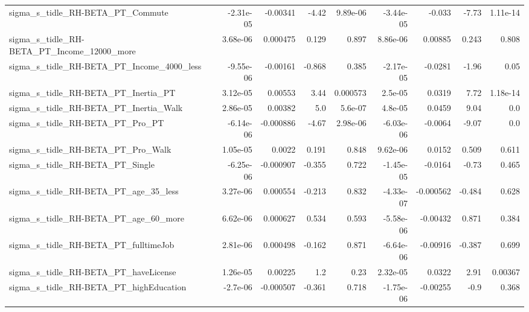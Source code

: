 \begin{tabular}{lrrrrrrrr}
sigma\_s\_tidle\_RH-BETA\_PT\_Commute                   &   -2.31e-05 &     -0.00341 &    -4.42 & 9.89e-06 &  -3.44e-05 &      -0.033 &        -7.73 &      1.11e-14 \\
sigma\_s\_tidle\_RH-BETA\_PT\_Income\_12000\_more         &    3.68e-06 &     0.000475 &    0.129 &    0.897 &   8.86e-06 &     0.00885 &        0.243 &         0.808 \\
sigma\_s\_tidle\_RH-BETA\_PT\_Income\_4000\_less          &   -9.55e-06 &     -0.00161 &   -0.868 &    0.385 &  -2.17e-05 &     -0.0281 &        -1.96 &          0.05 \\
sigma\_s\_tidle\_RH-BETA\_PT\_Inertia\_PT                &    3.12e-05 &      0.00553 &     3.44 & 0.000573 &    2.5e-05 &      0.0319 &         7.72 &      1.18e-14 \\
sigma\_s\_tidle\_RH-BETA\_PT\_Inertia\_Walk              &    2.86e-05 &      0.00382 &      5.0 &  5.6e-07 &    4.8e-05 &      0.0459 &         9.04 &           0.0 \\
sigma\_s\_tidle\_RH-BETA\_PT\_Pro\_PT                    &   -6.14e-06 &    -0.000886 &    -4.67 & 2.98e-06 &  -6.03e-06 &     -0.0064 &        -9.07 &           0.0 \\
sigma\_s\_tidle\_RH-BETA\_PT\_Pro\_Walk                  &    1.05e-05 &       0.0022 &    0.191 &    0.848 &   9.62e-06 &      0.0152 &        0.509 &         0.611 \\
sigma\_s\_tidle\_RH-BETA\_PT\_Single                    &   -6.25e-06 &    -0.000907 &   -0.355 &    0.722 &  -1.45e-05 &     -0.0164 &        -0.73 &         0.465 \\
sigma\_s\_tidle\_RH-BETA\_PT\_age\_35\_less               &    3.27e-06 &     0.000554 &   -0.213 &    0.832 &  -4.33e-07 &   -0.000562 &       -0.484 &         0.628 \\
sigma\_s\_tidle\_RH-BETA\_PT\_age\_60\_more               &    6.62e-06 &     0.000627 &    0.534 &    0.593 &  -5.58e-06 &    -0.00432 &        0.871 &         0.384 \\
sigma\_s\_tidle\_RH-BETA\_PT\_fulltimeJob               &    2.81e-06 &     0.000498 &   -0.162 &    0.871 &  -6.64e-06 &    -0.00916 &       -0.387 &         0.699 \\
sigma\_s\_tidle\_RH-BETA\_PT\_haveLicense               &    1.26e-05 &      0.00225 &      1.2 &     0.23 &   2.32e-05 &      0.0322 &         2.91 &       0.00367 \\
sigma\_s\_tidle\_RH-BETA\_PT\_highEducation             &    -2.7e-06 &    -0.000507 &   -0.361 &    0.718 &  -1.75e-06 &    -0.00255 &         -0.9 &         0.368 \\

\end{tabular}
